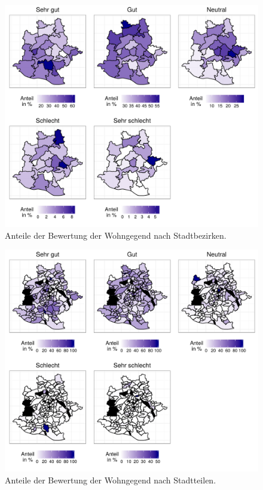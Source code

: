 \documentclass{Vorlage}
\begin{document}
\begin{appendix}
\begin{figure}[h]
 \begin{center}
 \includegraphics[scale=0.8]{Pictures/BWohn}
 \caption{Anteile der Bewertung der Wohngegend nach Stadtbezirken.}
 \label{BWohn}
 \end{center}
\end{figure}

\begin{figure}[h]
 \begin{center}
 \includegraphics[scale=0.8]{Pictures/SWohn}
 \caption{Anteile der Bewertung der Wohngegend nach Stadtteilen.}
 \label{SWohn}
 \end{center}
\end{figure}


\end{appendix}
\end{document}

